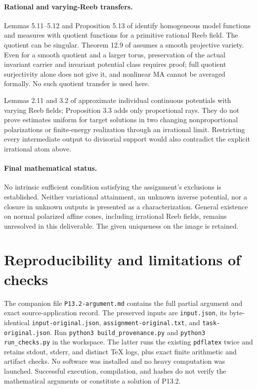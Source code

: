 \documentclass[11pt]{article}
\theoremstyle{remark}
\begin{document}
\paragraph{Rational and varying-Reeb transfers.}
Lemmas 5.11--5.12 and Proposition 5.13 of \cite{Wu21} identify homogeneous model functions and measures with quotient functions for a primitive rational Reeb field. The quotient can be singular. Theorem 12.9 of \cite{BJ22} assumes a smooth projective variety. Even for a smooth quotient and a larger torus, preservation of the actual invariant carrier and invariant potential class requires proof; full quotient surjectivity alone does not give it, and nonlinear MA cannot be averaged formally. No such quotient transfer is used here.

Lemmas 2.11 and 3.2 of \cite{Wu24} approximate individual continuous potentials with varying Reeb fields; Proposition 3.3 adds only proportional rays. They do not prove estimates uniform for target solutions in two changing nonproportional polarizations or finite-energy realization through an irrational limit. Restricting every intermediate output to divisorial support would also contradict the explicit irrational atom above.

\paragraph{Final mathematical status.}
No intrinsic sufficient condition satisfying the assignment's exclusions is established. Neither variational attainment, an unknown inverse potential, nor a closure in unknown outputs is presented as a characterization. General existence on normal polarized affine cones, including irrational Reeb fields, remains unresolved in this deliverable. The given uniqueness on the image is retained.

\section{Reproducibility and limitations of checks}
The companion file \texttt{P13.2-argument.md} contains the full partial argument and exact source-application record. The preserved inputs are \texttt{input.json}, its byte-identical \texttt{input-original.json}, \texttt{assignment-original.txt}, and \texttt{task-original.json}. Run \texttt{python3 build\_provenance.py} and \texttt{python3 run\_checks.py} in the workspace. The latter runs the existing \texttt{pdflatex} twice and retains stdout, stderr, and distinct TeX logs, plus exact finite arithmetic and artifact checks. No software was installed and no heavy computation was launched. Successful execution, compilation, and hashes do not verify the mathematical arguments or constitute a solution of P13.2.
\end{document}
